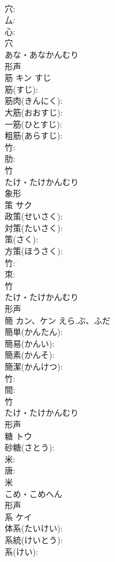 \documentclass[8pt]{extreport}
\begin{document}
\begin{CJK}{UTF8}{min}
\\	穴: 
\\	厶: 
\\	心: 
\\	穴	
\\	あな・あなかんむり	
\\	形声 
\\	筋	キン	すじ		
\\	筋(すじ): 
\\	筋肉(きんにく): 
\\	大筋(おおすじ): 
\\	一筋(ひとすじ): 
\\	粗筋(あらすじ): 
\\	竹: 
\\	肋: 
\\	竹	
\\	たけ・たけかんむり	
\\	象形 
\\	策	サク			
\\	政策(せいさく): 
\\	対策(たいさく): 
\\	策(さく): 
\\	方策(ほうさく): 
\\	竹: 
\\	朿: 
\\	竹	
\\	たけ・たけかんむり	
\\	形声 
\\	簡	カン、ケン	えら.ぶ、ふだ		
\\	簡単(かんたん): 
\\	簡易(かんい): 
\\	簡素(かんそ): 
\\	簡潔(かんけつ): 
\\	竹: 
\\	間: 
\\	竹	
\\	たけ・たけかんむり	
\\	形声 
\\	糖	トウ			
\\	砂糖(さとう): 
\\	米: 
\\	唐: 
\\	米	
\\	こめ・こめへん	
\\	形声 
\\	系	ケイ			
\\	体系(たいけい): 
\\	系統(けいとう): 
\\	系(けい): 

\end{CJK}
\end{document}
